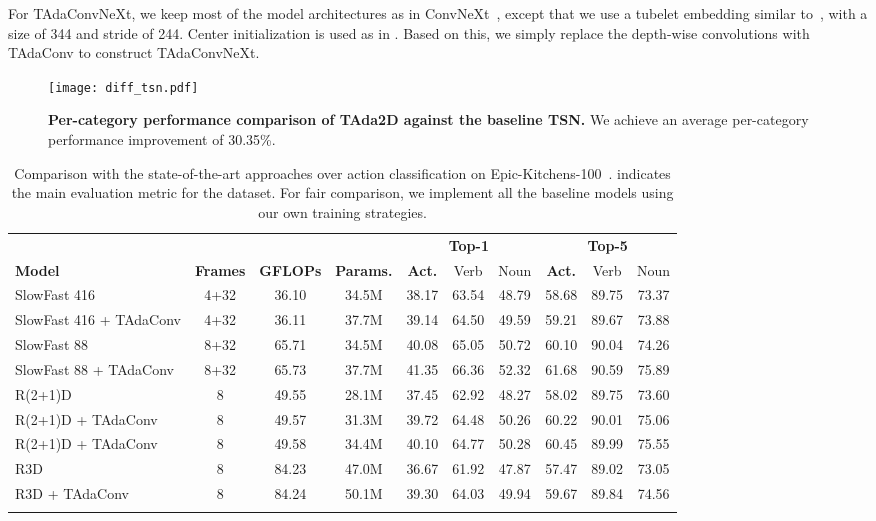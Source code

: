 \documentclass{article} \usepackage{iclr2022_conference,times}
\newcommand{\tablestyle}[2]{\setlength{\tabcolsep}{#1}\renewcommand{\arraystretch}{#2}\centering\small}
\def\x{}
\begin{document}
For TAdaConvNeXt, we keep most of the model architectures as in ConvNeXt~\citep{convnext}, except that we use a tubelet embedding similar to~\citep{arnab2021vivit}, with a size of 3\x4\x4 and stride of 2\x4\x4. Center initialization is used as in \citep{arnab2021vivit}. Based on this, we simply replace the depth-wise convolutions with TAdaConv to construct TAdaConvNeXt.
\begin{figure}[t]
\centering
\texttt{[image: diff\_tsn.pdf]}
\caption{\textbf{Per-category performance comparison of TAda2D against the baseline TSN.} We achieve an average per-category performance improvement of 30.35\%. }
\label{fig:diff_tsn}
\end{figure}
\begin{table}[t]
\caption{Comparison with the state-of-the-art approaches over action classification on Epic-Kitchens-100~\citep{ek100}.  indicates the main evaluation metric for the dataset. For fair comparison, we implement all the baseline models using our own training strategies.}
\centering
\tablestyle{3pt}{1.0}
\begin{tabular}{lccccccccc}
\shline
~ & ~ & ~ & ~ & \multicolumn{3}{c}{\bf Top-1} & \multicolumn{3}{c}{\bf Top-5} \\
\cmidrule(r){5-7}\cmidrule(r){8-10}
\bf Model & \bf Frames & \bf GFLOPs & \bf Params.& \textbf{Act.} & Verb & Noun &\textbf{Act.} & Verb & Noun \\
\hline
SlowFast 4\x16 & 4+32 & 36.10 & 34.5M & 38.17 & 63.54 & 48.79 & 58.68 & 89.75 & 73.37 \\
SlowFast 4\x16 + TAdaConv & 4+32 & 36.11 & 37.7M & 39.14 & 64.50 & 49.59 & 59.21 & 89.67 & 73.88 \\
\hline
SlowFast 8\x8 & 8+32 & 65.71 & 34.5M & 40.08 & 65.05 & 50.72 & 60.10 & 90.04 & 74.26 \\ 
SlowFast 8\x8 + TAdaConv & 8+32 & 65.73 & 37.7M & 41.35 & 66.36 & 52.32 & 61.68 & 90.59 & 75.89 \\
\hline
R(2+1)D & 8 & 49.55 & 28.1M & 37.45 & 62.92 & 48.27 & 58.02 & 89.75 & 73.60 \\
R(2+1)D + TAdaConv & 8 & 49.57 & 31.3M & 39.72 & 64.48 & 50.26 & 60.22 & 90.01 & 75.06\\
R(2+1)D + TAdaConv & 8 & 49.58 & 34.4M & 40.10 & 64.77 & 50.28 & 60.45 & 89.99 & 75.55\\
\hline
R3D & 8 & 84.23 & 47.0M & 36.67 & 61.92 & 47.87 & 57.47 & 89.02 & 73.05 \\
R3D + TAdaConv & 8 & 84.24 & 50.1M & 39.30 & 64.03 & 49.94 & 59.67 & 89.84 & 74.56\\
\shline
\end{tabular}
\label{tab:pluginevalepickitchen}
\end{table}
\end{document}
